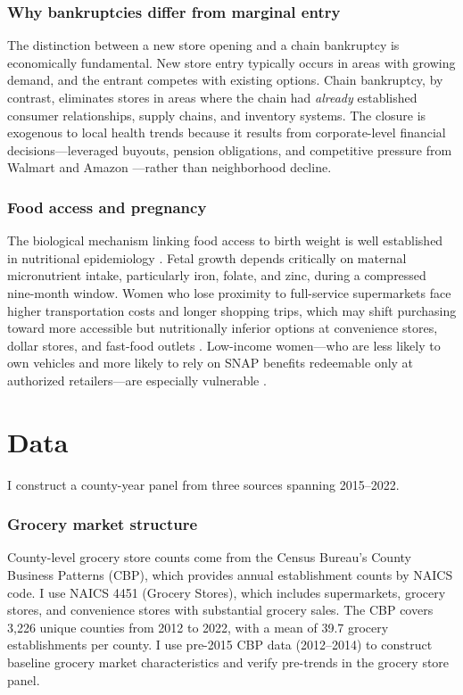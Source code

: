 \documentclass[12pt]{article}
\begin{document}
\subsubsection*{Why bankruptcies differ from marginal entry} The distinction between a new store opening and a chain bankruptcy is economically fundamental. New store entry typically occurs in areas with growing demand, and the entrant competes with existing options. Chain bankruptcy, by contrast, eliminates stores in areas where the chain had \textit{already} established consumer relationships, supply chains, and inventory systems. The closure is exogenous to local health trends because it results from corporate-level financial decisions---leveraged buyouts, pension obligations, and competitive pressure from Walmart and Amazon \citep{jarmin2019evolving}---rather than neighborhood decline.

\subsubsection*{Food access and pregnancy} The biological mechanism linking food access to birth weight is well established in nutritional epidemiology \citep{abu2010impact}. Fetal growth depends critically on maternal micronutrient intake, particularly iron, folate, and zinc, during a compressed nine-month window. Women who lose proximity to full-service supermarkets face higher transportation costs and longer shopping trips, which may shift purchasing toward more accessible but nutritionally inferior options at convenience stores, dollar stores, and fast-food outlets \citep{ver2009quality, handbury2015goods}. Low-income women---who are less likely to own vehicles and more likely to rely on SNAP benefits redeemable only at authorized retailers---are especially vulnerable \citep{bitler2010wic, gundersen2011food}.

\section{Data}

I construct a county-year panel from three sources spanning 2015--2022.

\subsubsection*{Grocery market structure} County-level grocery store counts come from the Census Bureau's County Business Patterns (CBP), which provides annual establishment counts by NAICS code. I use NAICS 4451 (Grocery Stores), which includes supermarkets, grocery stores, and convenience stores with substantial grocery sales. The CBP covers 3,226 unique counties from 2012 to 2022, with a mean of 39.7 grocery establishments per county. I use pre-2015 CBP data (2012--2014) to construct baseline grocery market characteristics and verify pre-trends in the grocery store panel.
\end{document}
